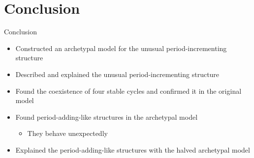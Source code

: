 \section{Conclusion}


\begin{frame}{Conclusion}
	\begin{itemize}
		\item Constructed an archetypal model for the unusual period-incrementing structure
		      \pause
		\item Described and explained the unusual period-incrementing structure
		      \pause
		\item Found the coexistence of four stable cycles and confirmed it in the original model
		      \pause
		\item Found period-adding-like structures in the archetypal model
		      \begin{itemize}
			      \item They behave unexpectedly
		      \end{itemize}
		      \pause
		\item Explained the period-adding-like structures with the halved archetypal model
	\end{itemize}
\end{frame}
